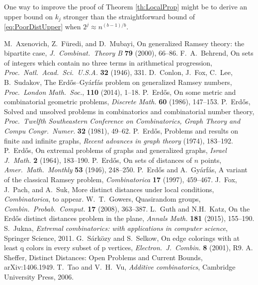 \documentclass[11pt]{article}
\newcounter{problems}
\newcommand{\parag}[1]{\vspace{2mm}

\noindent{\bf #1} }
\begin{document}
\parag{Remark. } One way to improve the proof of Theorem \ref{th:LocalProp} might be to derive an upper bound on $k_j$ stronger than the straightforward bound of \eqref{eq:PoorDistUpper} when $2^j\approx n^{(b-1)/b}$.

\begin{thebibliography}{99}
%
M.\ Axenovich, Z.\ F\"uredi, and D.\ Mubayi,
On generalized Ramsey theory: the bipartite case,
\emph{J.\ Combinat.\ Theory B} {\bf 79} (2000), 66--86.
%
F.\ A.\ Behrend,
On sets of integers which contain no three terms in arithmetical progression,
\emph{Proc.\ Natl.\ Acad.\ Sci.\ U.S.A.} {\bf 32} (1946), 331.
%
D.\ Conlon, J.\ Fox, C.\ Lee, B.\ Sudakov,
The Erd\H os--Gy\'arf\'as problem on generalized Ramsey numbers,
\emph{Proc.\ London Math.\ Soc.}, {\bf 110} (2014), 1--18.
%
P.\ Erd\H os,
On some metric and combinatorial geometric problems,
\emph{Discrete Math.} {\bf 60} (1986), 147--153.
%
P.\ Erd\H os,
Solved and unsolved problems in combinatorics and combinatorial number theory,
\emph{Proc.\ Twelfth Southeastern Conference on Combinatorics, Graph Theory and Compu Congr.\ Numer.} {\bf 32} (1981), 49--62.
%
P.\ Erd\H os,
Problems and results on finite and infinite graphs,
\emph{Recent advances in graph theory}  (1974), 183--192.
%
P.\ Erd\H os,
On extremal problems of graphs and generalized graphs,
\emph{Israel J.\ Math.} {\bf 2} (1964), 183--190.
%
P.\ Erd\H os,
On sets of distances of $n$ points,
\emph{Amer.\ Math.\ Monthly} {\bf 53} (1946), 248--250.
%
P.\ Erd\H os and A.\ Gy\'arf\'as,
A variant of the classical Ramsey problem,
\emph{Combinatorica} {\bf 17} (1997), 459--467.
%
J.\ Fox, J.\ Pach, and A.\ Suk,
More distinct distances under local conditions,
\emph{Combinatorica}, to appear.
%
W.\ T.\ Gowers,
Quasirandom groups,
\emph{Combin.\ Probab.\ Comput.} {\bf 17} (2008), 363--387.
%
L.\ Guth and N.H.\ Katz,
On the Erd{\H o}s distinct distances problem in the plane,
{\em Annals Math.} {\bf 181} (2015), 155--190.
%
S.\ Jukna,
\emph{Extremal combinatorics: with applications in computer science},
Springer Science, 2011.
%
 G.\ S\'ark\"ozy and S.\ Selkow,
 On edge colorings with at least q colors in every subset of p vertices,
\emph{Electron.\ J.\ Combin.} {\bf 8} (2001), R9.
%
A. Sheffer,
Distinct Distances: Open Problems and Current Bounds,
arXiv:1406.1949.
%
T.\ Tao and V.\ H.\ Vu,
\emph{Additive combinatorics}, Cambridge University Press, 2006.
%
\end{thebibliography}


\end{document}
